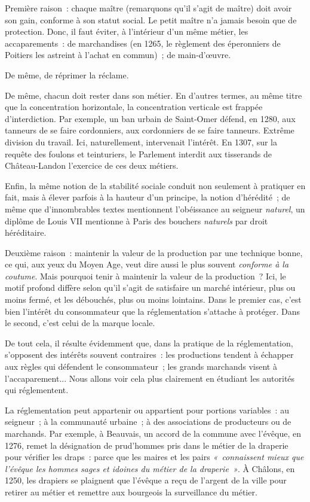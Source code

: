 \documentclass[french,twoside]{book} %
\begin{document}
\noindent Première raison : chaque maître (remarquons qu’il s’agit de maître) doit avoir son gain, conforme à son statut social. Le petit maître n’a jamais besoin que de protection. Donc, il faut éviter, à l’intérieur d’un même métier, les accaparements : de marchandises (en 1265, le règlement des éperonniers de Poitiers les astreint à l’achat en commun) ; de main-d’œuvre.\par
De même, de réprimer la réclame.\par
De même, chacun doit rester dans son métier. En d’autres termes, au même titre que la concentration horizontale, la concentration verticale est frappée d’interdiction. Par exemple, un ban urbain de Saint-Omer défend, en 1280, aux tanneurs de se faire cordonniers, aux cordonniers de se faire tanneurs. Extrême division du travail. Ici, naturellement, intervenait l’intérêt. En 1307, sur la requête des foulons et teinturiers, le Parlement interdit aux tisserands de Château-Landon l’exercice de ces deux métiers.\par
Enfin, la même notion de la stabilité sociale conduit non seulement à pratiquer en fait, mais à élever parfois à la hauteur d’un principe, la notion d’hérédité ; de même que d’innombrables textes mentionnent l’obéissance au seigneur \emph{naturel}, un diplôme de Louis VII mentionne à Paris des bouchers \emph{naturels} par droit héréditaire.\par
\bigbreak
\noindent Deuxième raison : maintenir la valeur de la production par une technique bonne, ce qui, aux yeux du Moyen Age, veut dire aussi le plus souvent \emph{conforme à la coutume}. Mais pourquoi tenir à maintenir la valeur de la production ? Ici, le motif profond diffère selon qu’il s’agit de satisfaire un marché intérieur, plus ou moins fermé, et les débouchés, plus ou moins lointains. Dans le premier cas, c’est bien l’intérêt du consommateur que la réglementation s’attache à protéger. Dans le second, c’est celui de la marque locale.\par
De tout cela, il résulte évidemment que, dans la pratique de la réglementation, s’opposent des intérêts souvent contraires : les productions tendent à échapper aux règles qui défendent le consommateur ; les grands marchands visent à l’accaparement... Nous allons voir cela plus clairement en étudiant les autorités qui réglementent.\par
La réglementation peut appartenir ou appartient pour portions variables : au seigneur ; à la communauté urbaine ; à des associations de producteurs ou de marchands. Par exemple, à Beauvais, un accord de la commune avec l’évêque, en 1276, remet la désignation de prud’hommes pris dans le métier de la draperie pour vérifier les draps : parce que les maires et les pairs \emph{« connaissent mieux que l’évêque les hommes sages et idoines du métier de la draperie »}. À Châlons, en 1250, les drapiers se plaignent que l’évêque a reçu de l’argent de la ville pour retirer au métier et remettre aux bourgeois la surveillance du métier.\par
\end{document}
